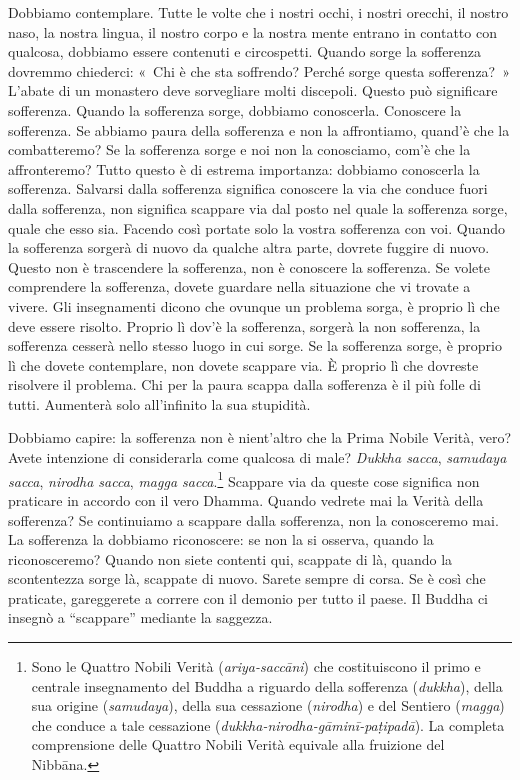 Dobbiamo contemplare. Tutte le volte che i nostri occhi, i nostri
orecchi, il nostro naso, la nostra lingua, il nostro corpo e la nostra
mente entrano in contatto con qualcosa, dobbiamo essere contenuti e
circospetti. Quando sorge la sofferenza dovremmo chiederci: «~Chi è che
sta soffrendo? Perché sorge questa sofferenza?~» L'abate di un monastero
deve sorvegliare molti discepoli. Questo può significare sofferenza.
Quando la sofferenza sorge, dobbiamo conoscerla. Conoscere la
sofferenza. Se abbiamo paura della sofferenza e non la affrontiamo,
quand'è che la combatteremo? Se la sofferenza sorge e noi non la
conosciamo, com'è che la affronteremo? Tutto questo è di estrema
importanza: dobbiamo conoscerla la sofferenza. Salvarsi dalla sofferenza
significa conoscere la via che conduce fuori dalla sofferenza, non
significa scappare via dal posto nel quale la sofferenza sorge, quale
che esso sia. Facendo così portate solo la vostra sofferenza con voi.
Quando la sofferenza sorgerà di nuovo da qualche altra parte, dovrete
fuggire di nuovo. Questo non è trascendere la sofferenza, non è
conoscere la sofferenza. Se volete comprendere la sofferenza, dovete
guardare nella situazione che vi trovate a vivere. Gli insegnamenti
dicono che ovunque un problema sorga, è proprio lì che deve essere
risolto. Proprio lì dov'è la sofferenza, sorgerà la non sofferenza, la
sofferenza cesserà nello stesso luogo in cui sorge. Se la sofferenza
sorge, è proprio lì che dovete contemplare, non dovete scappare via. È
proprio lì che dovreste risolvere il problema. Chi per la paura scappa
dalla sofferenza è il più folle di tutti. Aumenterà solo all'infinito la
sua stupidità.

Dobbiamo capire: la sofferenza non è nient'altro che la Prima Nobile
Verità, vero? Avete intenzione di considerarla come qualcosa di male?
\emph{Dukkha sacca}, \emph{samudaya sacca}, \emph{nirodha sacca},
\emph{magga sacca}.\footnote{Sono le Quattro Nobili Verità
  (\emph{ariya-saccāni}) che costituiscono il primo e centrale
  insegnamento del Buddha a riguardo della sofferenza (\emph{dukkha}),
  della sua origine (\emph{samudaya}), della sua cessazione
  (\emph{nirodha}) e del Sentiero (\emph{magga}) che conduce a tale
  cessazione (\emph{dukkha-nirodha-gāminī-paṭipadā}). La completa
  comprensione delle Quattro Nobili Verità equivale alla fruizione del
  Nibbāna.} Scappare via da queste cose significa non praticare
in accordo con il vero Dhamma. Quando vedrete mai la Verità della
sofferenza? Se continuiamo a scappare dalla sofferenza, non la
conosceremo mai. La sofferenza la dobbiamo riconoscere: se non la si
osserva, quando la riconosceremo? Quando non siete contenti qui,
scappate di là, quando la scontentezza sorge là, scappate di nuovo.
Sarete sempre di corsa. Se è così che praticate, gareggerete a correre
con il demonio per tutto il paese. Il Buddha ci insegnò a ``scappare''
mediante la saggezza.

